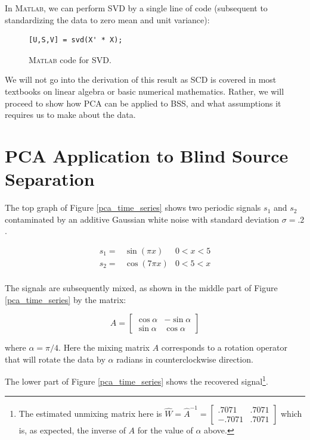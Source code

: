 \documentclass[11pt, oneside, a4paper]{report}
\begin{document}
In \textsc{Matlab}, we can perform SVD by a single line of code
(subsequent to standardizing the data to zero mean and unit variance):

\begin{figure}[!htpb]
  \begin{lstlisting}[frame=single]
   [U,S,V] = svd(X' * X);
  \end{lstlisting}
  \caption{\textsc{Matlab} code for SVD.}
  \label{svd_code}
\end{figure}

We will not go into the derivation of this result as SCD is covered
in most textbooks on linear algebra or basic numerical
mathematics. Rather, we will proceed to show how PCA can be applied to
BSS, and what assumptions it requires us to make about the data.



\section{PCA Application to Blind Source Separation}\label{pca_bss}

The top graph of Figure \ref{pca_time_series} shows two periodic signals $s_1$ and $s_2$ contaminated by an additive Gaussian white noise with standard deviation $\sigma = .2$.

\begin{equation}
      \begin{array}{lll}
        s_1 = & \sin(\pi x) & 0<x<5\\
        s_2 = & \cos(7 \pi x) & 0<5<x\\
    \end{array}
\end{equation}

The signals are subsequently mixed, as shown in the middle part of Figure \ref{pca_time_series} by the matrix:

\begin{equation}
  A = \begin{bmatrix} \cos \alpha & -\sin \alpha \\ \sin \alpha & \cos \alpha \end{bmatrix}
\end{equation}

where $\alpha = \pi/4$. Here the mixing matrix $A$ corresponds to a rotation operator that will rotate the data by $\alpha$ radians in counterclockwise direction. 

The lower part of Figure \ref{pca_time_series} shows the recovered signal\footnote{The estimated unmixing matrix here is $\hat{W} = \hat{A}^{-1} = \begin{bmatrix} .7071 & .7071 \\ -.7071 & .7071 \end{bmatrix}$ which is, as expected, the inverse of $A$ for the value of $\alpha$ above.}.
\end{document}
